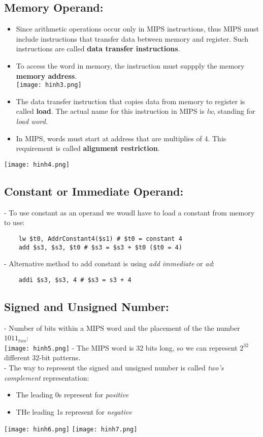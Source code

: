 \documentclass[10pt]{article}
\begin{document}
	\subsection{Memory Operand: }
	\begin{itemize}
		\item Since arithmetic operations occur only in MIPS instructions, thus MIPS must include instructions that transfer data between memory and register. Such instructions are called \textbf{data transfer instructions}. 
		\item To access the word in memory, the instruction must suppply the memory \textbf{memory address}. \\
	 		\texttt{[image: hinh3.png]}
			\bigbreak
		\item The data transfer instruction that copies data from memory to register is called \textbf{load}. The actual name for this instruction in MIPS is \textit{lw}, standing for \textit{load word}.
		\item In MIPS, words must start at address that are multiplies of 4. This requirement is called \textbf{alignment restriction}.
	\end{itemize}

	\texttt{[image: hinh4.png]}

	\subsection{Constant or Immediate Operand: }
	- To use constant as an operand we woudl have to load a constant from memory to use: \\
	\begin{verbatim}
	lw $t0, AddrConstant4($s1) # $t0 = constant 4
	add $s3, $s3, $t0 # $s3 = $s3 + $t0 ($t0 = 4)
	\end{verbatim}

	- Alternative method to add constant is using \textit{add immediate} or \textit{ad}: \\
	\begin{verbatim}
	addi $s3, $s3, 4 # $s3 = s3 + 4
	\end{verbatim}

	\subsection{Signed and Unsigned Number: }
	- Number of bits within a MIPS word and the placement of the the number $1011_{two}$: \\
	\texttt{[image: hinh5.png]}
	\bigbreak
	- The MIPS word is 32 bits long, so we can represent $2^{32}$ different 32-bit patterns. \\
	- The way to represent the signed and unsigned number is called \textit{two's complement} representation:
	\begin{itemize}
		\item The leading 0s represent for \textit{positive}
		\item THe leading 1s represent for \textit{negative}
	\end{itemize}
	\texttt{[image: hinh6.png]} 
	\bigbreak
	\texttt{[image: hinh7.png]}
	\bigbreak
\end{document}

